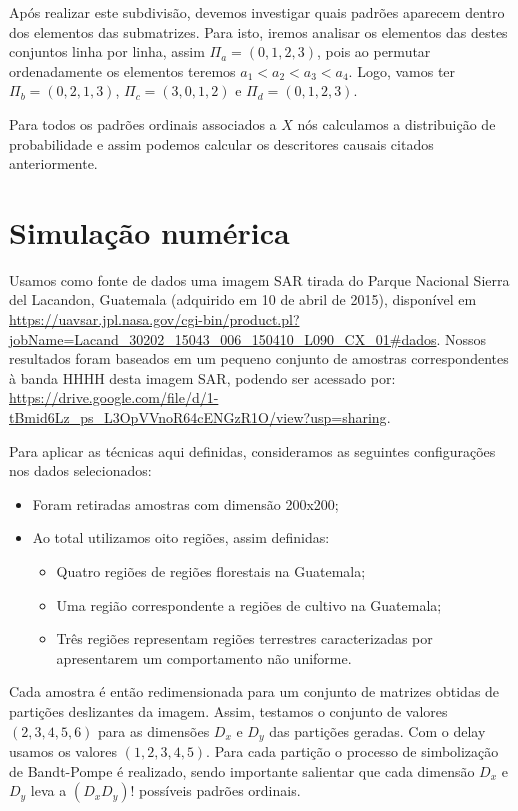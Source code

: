 \documentclass[12pt]{article}
\begin{document}
Após realizar este subdivisão, devemos investigar quais padrões aparecem dentro dos elementos das submatrizes. Para isto, iremos analisar os elementos das destes conjuntos linha por linha, assim $\Pi_{a} = (0,1,2,3)$, pois ao permutar ordenadamente os elementos teremos $a_{1} < a_{2} < a_{3} < a_{4}$. Logo, vamos ter $\Pi_{b} = (0,2,1,3)$, $\Pi_{c} = (3,0,1,2)$ e $\Pi_{d} = (0,1,2,3)$. 

Para todos os padrões ordinais associados a $X$ nós calculamos a distribuição de probabilidade e assim podemos calcular os descritores causais citados anteriormente.

\section{Simulação numérica}

Usamos como fonte de dados uma imagem SAR tirada do Parque Nacional Sierra del Lacandon, Guatemala (adquirido em 10 de abril de 2015), disponível em \url{https://uavsar.jpl.nasa.gov/cgi-bin/product.pl?jobName=Lacand_30202_15043_006_150410_L090_CX_01#dados}. Nossos resultados foram baseados em um pequeno conjunto de amostras correspondentes à banda HHHH desta imagem SAR, podendo ser acessado por: \url{https://drive.google.com/file/d/1-tBmid6Lz_ps_L3OpVVnoR64cENGzR1O/view?usp=sharing}.

Para aplicar as técnicas aqui definidas, consideramos as seguintes configurações nos dados selecionados:

\begin{itemize}
    \item Foram retiradas amostras com dimensão 200x200;
    \item Ao total utilizamos oito regiões, assim definidas:
    \begin{itemize}
        \item Quatro regiões de regiões florestais na Guatemala;
        \item Uma região correspondente a regiões de cultivo na Guatemala;
        \item Três regiões representam regiões terrestres caracterizadas por apresentarem um comportamento não uniforme.
    \end{itemize}
\end{itemize}

Cada amostra é então redimensionada para um conjunto de matrizes obtidas de partições deslizantes da imagem. Assim, testamos o conjunto de valores $(2,3,4,5,6)$ para as dimensões $D_{x}$ e $D_{y}$ das partições geradas. Com o delay usamos os valores $(1,2,3,4,5)$. Para cada partição o processo de simbolização de Bandt-Pompe é realizado, sendo importante salientar que cada dimensão $D_{x}$ e $D_{y}$ leva a $(D_{x}D_{y})!$ possíveis padrões ordinais. 
\end{document}
